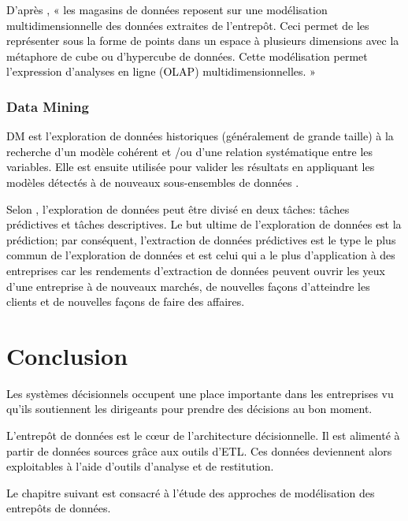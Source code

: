 \documentclass[a4paper,12pt]{report}
\begin{document}
\textcolor{black}{D’après \citep{tournier2007analyse}, « les magasins de données reposent sur une modélisation multidimensionnelle des données extraites de l’entrepôt. Ceci permet de les représenter sous la forme de points dans un espace à plusieurs dimensions avec la métaphore de cube ou d’hypercube de données. Cette modélisation permet l’expression d’analyses en ligne (OLAP) multidimensionnelles. »}
\subsubsection{Data Mining}
\textcolor{black}{DM est l'exploration de données historiques (généralement de grande taille) à la recherche d'un modèle cohérent et /ou d'une relation systématique entre les variables. Elle est ensuite utilisée pour valider les résultats en appliquant les modèles détectés à de nouveaux sous-ensembles de données \citep{berry2000mastering}.}

\textcolor{black}{Selon \citep{fayyad1996advances}, l'exploration de données peut être divisé en deux tâches: tâches prédictives et tâches descriptives. Le but ultime de l'exploration de données est la prédiction; par conséquent, l'extraction de données prédictives est le type le plus commun de l'exploration de données et est celui qui a le plus d'application à des entreprises car les rendements d'extraction de données  peuvent ouvrir les yeux d'une entreprise à de nouveaux marchés, de nouvelles façons d'atteindre les clients et de nouvelles façons de faire des affaires. }

\section*{Conclusion}
\textcolor{black}{Les systèmes décisionnels occupent une place importante dans les entreprises vu qu’ils soutiennent les dirigeants pour prendre des décisions au bon moment.} 

\textcolor{black}{L’entrepôt de données est le cœur de l’architecture décisionnelle.  Il est alimenté à partir de données sources grâce aux outils d’ETL. Ces données deviennent alors exploitables à l’aide d’outils d’analyse et de restitution.}

\textcolor{black}{Le chapitre suivant est consacré à l’étude des approches de modélisation des entrepôts de données.}
\end{document}
